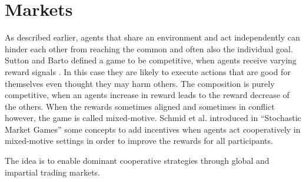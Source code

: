 \section{Markets}\label{market}
As described earlier, agents that share an environment and act independently can hinder each other from reaching the common and often also the individual goal. Sutton and Barto defined a game to be competitive, when agents receive varying reward signals \cite{suba18}. In this case they are likely to execute actions that are good for themselves even thought they may harm others. The composition is purely competitive, when an agents increase in reward leads to the reward decrease of the others. When the rewards sometimes aligned and sometimes in conflict however, the game is called mixed-motive. Schmid et al. introduced in ``Stochastic Market Games'' \cite{scbe21} some concepts to add incentives when agents act cooperatively in mixed-motive settings in order to improve the rewards for all participants.

The idea is to enable dominant cooperative strategies through global and impartial trading markets.
